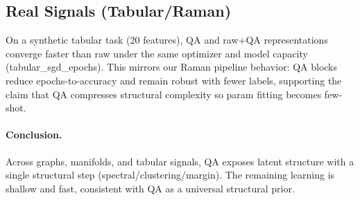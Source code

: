 \subsection{Real Signals (Tabular/Raman)}
\label{subsec:tabular}
On a synthetic tabular task (20 features), QA and raw+QA representations converge faster than raw under the same optimizer and model capacity (tabular\_sgd\_epochs). This mirrors our Raman pipeline behavior: QA blocks reduce epochs-to-accuracy and remain robust with fewer labels, supporting the claim that QA compresses structural complexity so param fitting becomes few-shot.

\paragraph{Conclusion.} Across graphs, manifolds, and tabular signals, QA exposes latent structure with a single structural step (spectral/clustering/margin). The remaining learning is shallow and fast, consistent with QA as a universal structural prior.
